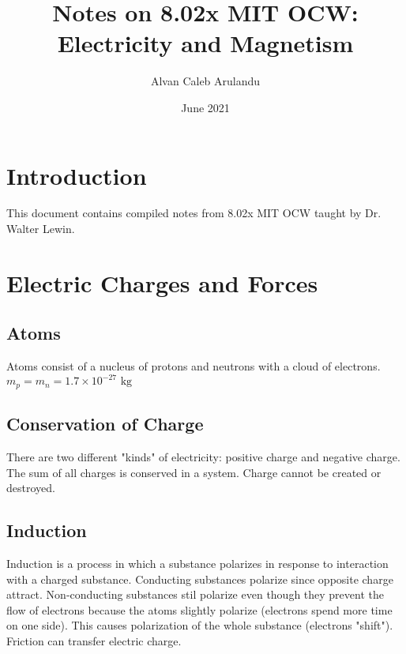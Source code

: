 \documentclass{article}
\title{Notes on 8.02x MIT OCW: Electricity and Magnetism}
\author{Alvan Caleb Arulandu}
\date{June 2021}
\newcommand{\kg}{\text{ kg}}
\begin{document}
\maketitle
\section{Introduction}
This document contains compiled notes from 8.02x MIT OCW taught by Dr. Walter Lewin. 
\section{Electric Charges and Forces}
\subsection{Atoms}
Atoms consist of a nucleus of protons and neutrons with a cloud of electrons.
$m_{p}=m_{n}=1.7\times 10^{-27}\kg$  

\subsection{Conservation of Charge}
There are two different "kinds" of electricity: positive charge and negative charge.
The sum of all charges is conserved in a system. Charge cannot be created or destroyed.

\subsection{Induction}
Induction is a process in which a substance polarizes in response to interaction with
a charged substance. Conducting substances polarize since opposite charge attract.
Non-conducting substances stil polarize even though they prevent the flow of electrons
because the atoms slightly polarize (electrons spend more time on one side). This causes
polarization of the whole substance (electrons "shift"). Friction can transfer electric charge.
\end{document}

